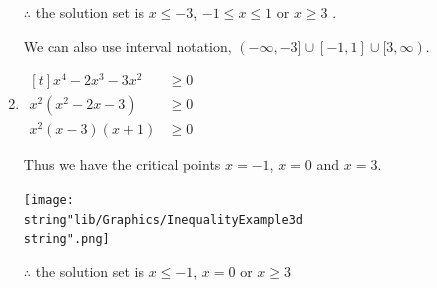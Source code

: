 \documentclass[11pt,a4paper]{book}
\begin{document}
\begin{example}{}
\begin{enumerate}[label=(\alph*),itemsep=1cm]
$\therefore$ the solution set is $x\leq-3$, $-1\leq x\leq1$ or
$x\geq3$ .

We can also use interval notation, $(-\infty,-3]\cup\left[-1,1\right]\cup[3,\infty)$.


\item
$
\begin{aligned}[t]
x^{4}-2x^{3}-3x^{2} & \geq0\\
x^{2}\left(x^{2}-2x-3\right) & \geq0\\
x^{2}\left(x-3\right)\left(x+1\right) & \geq0
\end{aligned}
$

Thus we have the critical points $x=-1$, $x=0$ and $x=3$.
\begin{center}
\texttt{[image: \\string"lib/Graphics/InequalityExample3d\\string".png]}
\par\end{center}

$\therefore$ the solution set is $x\leq-1$, $x=0$ or $x\geq3$

\end{enumerate}
\end{example}
\end{document}
